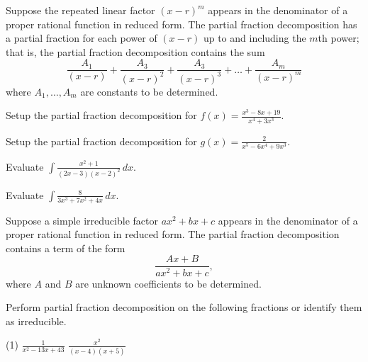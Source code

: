 \documentclass[../mathNotesPreamble]{subfiles}
\begin{document}
  \begin{thmBox*}
    Suppose the repeated linear factor $(x-r)^m$ appears in the denominator of a proper rational function in reduced form. The partial fraction decomposition has a partial fraction for each power of $(x-r)$ up to and including the $m$th power; that is, the partial fraction decomposition contains the sum  
    \[\frac{A_1}{(x-r)}+\frac{A_3}{(x-r)^2}+\frac{A_3}{(x-r)^3}+\dots+\frac{A_m}{(x-r)^m}\]
    where $A_1,\dots,A_m$ are constants to be determined.
  \end{thmBox*}
  \begin{ex*}
    Setup the partial fraction decomposition for $\displaystyle f(x)=\frac{x^3-8x+19}{x^4+3x^3}$.
  \end{ex*}
  \begin{ex*}
    Setup the partial fraction decomposition for $\displaystyle g(x)=\frac{2}{x^5-6x^4+9x^3}$.
  \end{ex*}
  \pagebreak

  \begin{ex*}
    Evaluate $\displaystyle \int \frac{x^2+1}{(2x-3)(x-2)^2}\,dx$.
  \end{ex*}
  \pagebreak

  \begin{ex*}
    Evaluate $\displaystyle \int \frac{8}{3x^3+7x^2+4x}\,dx$.
  \end{ex*}
  \pagebreak


  \begin{thmBox*}
    Suppose a simple irreducible factor $ax^2+bx+c$ appears in the denominator of a proper rational function in reduced form. The partial fraction decomposition contains a term of the form
      \[\frac{Ax+B}{ax^2+bx+c},\]
    where $A$ and $B$ are unknown coefficients to be determined.
  \end{thmBox*}

  \begin{ex*}
    Perform partial fraction decomposition on the following fractions or identify them as irreducible.
  \end{ex*}
  \begin{tasks}[after-item-skip=\stretch{1}, label=, item-indent=0mm](1)
    \task $\displaystyle \frac{1}{x^2-13x+43}$
    \task $\displaystyle \frac{x^2}{(x-4)(x+5)}$
  \end{tasks}
  \pagebreak
\end{document}
